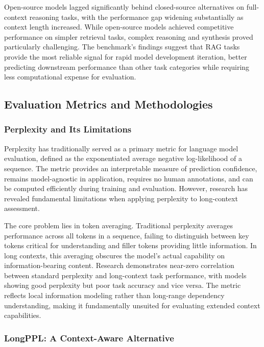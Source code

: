 \documentclass[11pt,letterpaper]{article}
\begin{document}
Open-source models lagged significantly behind closed-source alternatives on full-context reasoning tasks, with the performance gap widening substantially as context length increased. While open-source models achieved competitive performance on simpler retrieval tasks, complex reasoning and synthesis proved particularly challenging. The benchmark's findings suggest that RAG tasks provide the most reliable signal for rapid model development iteration, better predicting downstream performance than other task categories while requiring less computational expense for evaluation.

\subsection{Evaluation Metrics and Methodologies}

\subsubsection{Perplexity and Its Limitations}

Perplexity has traditionally served as a primary metric for language model evaluation, defined as the exponentiated average negative log-likelihood of a sequence. The metric provides an interpretable measure of prediction confidence, remains model-agnostic in application, requires no human annotations, and can be computed efficiently during training and evaluation. However, research has revealed fundamental limitations when applying perplexity to long-context assessment.

The core problem lies in token averaging. Traditional perplexity averages performance across all tokens in a sequence, failing to distinguish between key tokens critical for understanding and filler tokens providing little information. In long contexts, this averaging obscures the model's actual capability on information-bearing content. Research demonstrates near-zero correlation between standard perplexity and long-context task performance, with models showing good perplexity but poor task accuracy and vice versa. The metric reflects local information modeling rather than long-range dependency understanding, making it fundamentally unsuited for evaluating extended context capabilities.

\subsubsection{LongPPL: A Context-Aware Alternative}
\end{document}

